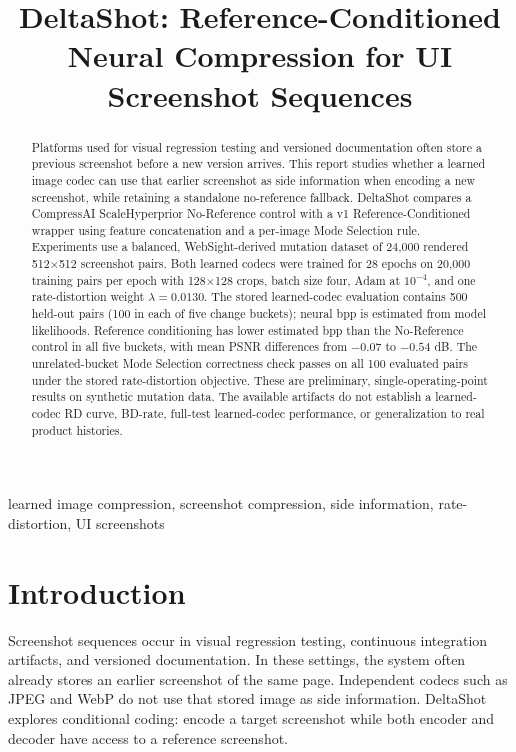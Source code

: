 \documentclass[conference]{IEEEtran}
\title{DeltaShot: Reference-Conditioned Neural Compression for UI Screenshot Sequences}
\author{\IEEEauthorblockN{Rithun K P, Balagopal V, and Saavan Rajeev}
\IEEEauthorblockA{B.Tech. Computer Science and Engineering (Artificial Intelligence)\\
Amrita Vishwa Vidyapeetham, Amritapuri, India\\
AM.SC.U4AIE24041, AM.SC.U4AIE24012, AM.SC.U4AIE24065}}
\begin{document}
\maketitle

\begin{abstract}
Platforms used for visual regression testing and versioned documentation often store a previous screenshot before a new version arrives. This report studies whether a learned image codec can use that earlier screenshot as side information when encoding a new screenshot, while retaining a standalone no-reference fallback. DeltaShot compares a CompressAI ScaleHyperprior No-Reference control with a v1 Reference-Conditioned wrapper using feature concatenation and a per-image Mode Selection rule. Experiments use a balanced, WebSight-derived mutation dataset of 24,000 rendered 512$\times$512 screenshot pairs. Both learned codecs were trained for 28 epochs on 20,000 training pairs per epoch with 128$\times$128 crops, batch size four, Adam at $10^{-4}$, and one rate-distortion weight $\lambda=0.0130$. The stored learned-codec evaluation contains 500 held-out pairs (100 in each of five change buckets); neural bpp is estimated from model likelihoods. Reference conditioning has lower estimated bpp than the No-Reference control in all five buckets, with mean PSNR differences from $-0.07$ to $-0.54$ dB. The unrelated-bucket Mode Selection correctness check passes on all 100 evaluated pairs under the stored rate-distortion objective. These are preliminary, single-operating-point results on synthetic mutation data. The available artifacts do not establish a learned-codec RD curve, BD-rate, full-test learned-codec performance, or generalization to real product histories.
\end{abstract}

\begin{IEEEkeywords}
learned image compression, screenshot compression, side information, rate-distortion, UI screenshots
\end{IEEEkeywords}

\section{Introduction}
Screenshot sequences occur in visual regression testing, continuous integration artifacts, and versioned documentation. In these settings, the system often already stores an earlier screenshot of the same page. Independent codecs such as JPEG and WebP do not use that stored image as side information. DeltaShot explores conditional coding: encode a target screenshot while both encoder and decoder have access to a reference screenshot.
\end{document}
